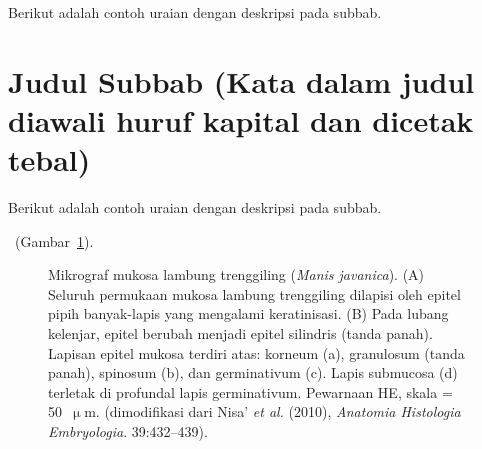 Berikut adalah contoh uraian dengan deskripsi pada subbab. \dotfill

\noindent\dotfill

\noindent\dotfill

\section[Judul Subbab]{Judul Subbab (Kata dalam judul diawali huruf kapital dan dicetak tebal)}

Berikut adalah contoh uraian dengan deskripsi pada subbab. \dotfill

\noindent\dotfill

\noindent\dotfill

\noindent\dotfill

\noindent\dotfill\ (Gambar~\ref{fig:mukosa-trenggiling}).

\begin{figure}[htbp]
  \centering
  \vspace{0.25cm}
  \caption[Mikrograf mukosa lambung trenggiling
    (\textit{Manis javanica})]{Mikrograf mukosa lambung trenggiling
    (\textit{Manis javanica}). (A) Seluruh permukaan mukosa lambung
    trenggiling dilapisi oleh epitel pipih banyak-lapis yang mengalami
    keratinisasi. (B) Pada lubang kelenjar, epitel berubah menjadi epitel
    silindris (tanda panah). Lapisan epitel mukosa terdiri atas: korneum (a),
    granulosum (tanda panah), spinosum (b), dan germinativum (c). Lapis
    submucosa (d) terletak di profundal lapis germinativum. Pewarnaan HE,
    skala = 50~$\upmu$m. (dimodifikasi dari Nisa' \textit{et al.} (2010),
    \textit{Anatomia Histologia Embryologia}. 39:432--439).}
  \label{fig:mukosa-trenggiling}
\end{figure}

